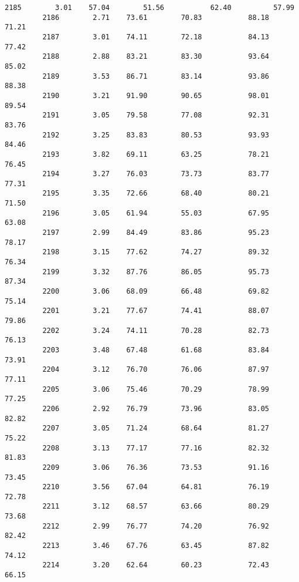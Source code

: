 \documentclass[11pt]{llncs}
\begin{document}
\begin{Verbatim}[commandchars=\\\{\}]
         2185        3.01    57.04        51.56           62.40          57.99   
         2186        2.71    73.61        70.83           88.18          71.21   
         2187        3.01    74.11        72.18           84.13          77.42   
         2188        2.88    83.21        83.30           93.64          85.02   
         2189        3.53    86.71        83.14           93.86          88.38   
         2190        3.21    91.90        90.65           98.01          89.54   
         2191        3.05    79.58        77.08           92.31          83.76   
         2192        3.25    83.83        80.53           93.93          84.46   
         2193        3.82    69.11        63.25           78.21          76.45   
         2194        3.27    76.03        73.73           83.77          77.31   
         2195        3.35    72.66        68.40           80.21          71.50   
         2196        3.05    61.94        55.03           67.95          63.08   
         2197        2.99    84.49        83.86           95.23          78.17   
         2198        3.15    77.62        74.27           89.32          76.34   
         2199        3.32    87.76        86.05           95.73          87.34   
         2200        3.06    68.09        66.48           69.82          75.14   
         2201        3.21    77.67        74.41           88.07          79.86   
         2202        3.24    74.11        70.28           82.73          76.13   
         2203        3.48    67.48        61.68           83.84          73.91   
         2204        3.12    76.70        76.06           87.97          77.11   
         2205        3.06    75.46        70.29           78.99          77.25   
         2206        2.92    76.79        73.96           83.05          82.82   
         2207        3.05    71.24        68.64           81.27          75.22   
         2208        3.13    77.17        77.16           82.32          81.83   
         2209        3.06    76.36        73.53           91.16          73.45   
         2210        3.56    67.04        64.81           76.19          72.78   
         2211        3.12    68.57        63.66           80.29          73.68   
         2212        2.99    76.77        74.20           76.92          82.42   
         2213        3.46    67.76        63.45           87.82          74.12   
         2214        3.20    62.64        60.23           72.43          66.15   
         

\end{Verbatim}
\end{document}
